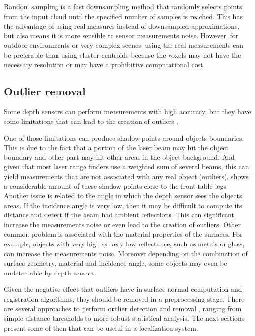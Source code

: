 Random sampling \cite{Vitter1984} is a fast downsampling method that randomly selects points from the input cloud until the specified number of samples is reached. This has the advantage of using real measures instead of downsampled approximations, but also means it is more sensible to sensor measurements noise. However, for outdoor environments or very complex scenes, using the real measurements can be preferable than using cluster centroids because the voxels may not have the necessary resolution or may have a prohibitive computational cost.


\subsection{Outlier removal}

Some depth sensors can perform measurements with high accuracy, but they have some limitations that can lead to the creation of outliers \cite{Sotoodeh2006}.

One of those limitations can produce shadow points around objects boundaries. This is due to the fact that a portion of the laser beam may hit the object boundary and other part may hit other areas in the object background. And given that most laser range finders use a weighted sum of several beams, this can yield measurements that are not associated with any real object (outliers).  shows a considerable amount of these shadow points close to the front table legs. Another issue is related to the angle in which the depth sensor sees the objects areas. If the incidence angle is very low, then it may be difficult to compute its distance and detect if the beam had ambient reflections. This can significant increase the measurements noise or even lead to the creation of outliers. Other common problem is associated with the material properties of the surfaces. For example, objects with very high or very low reflectance, such as metals or glass, can increase the measurements noise. Moreover depending on the combination of surface geometry, material and incidence angle, some objects may even be undetectable by depth sensors.

Given the negative effect that outliers have in surface normal computation and registration algorithms, they should be removed in a preprocessing stage. There are several approaches to perform outlier detection and removal \cite{YangZhang2010}, ranging from simple distance thresholds to more robust statistical analysis. The next sections present some of then that can be useful in a localization system.


